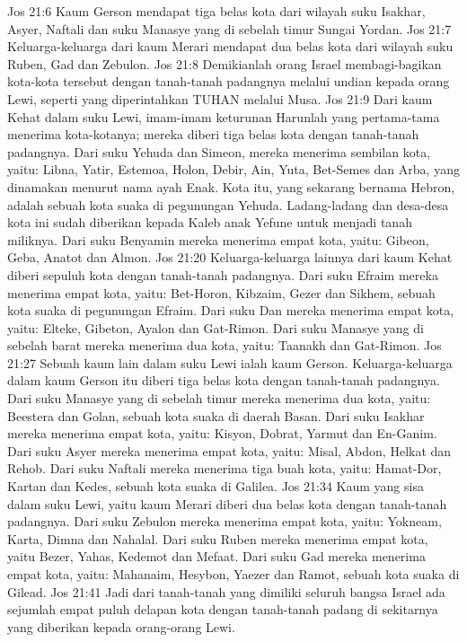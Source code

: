 Jos 21:6  Kaum Gerson mendapat tiga belas kota dari wilayah suku Isakhar, Asyer, Naftali dan suku Manasye yang di sebelah timur Sungai Yordan.
Jos 21:7  Keluarga-keluarga dari kaum Merari mendapat dua belas kota dari wilayah suku Ruben, Gad dan Zebulon.
Jos 21:8  Demikianlah orang Israel membagi-bagikan kota-kota tersebut dengan tanah-tanah padangnya melalui undian kepada orang Lewi, seperti yang diperintahkan TUHAN melalui Musa.
Jos 21:9  Dari kaum Kehat dalam suku Lewi, imam-imam keturunan Harunlah yang pertama-tama menerima kota-kotanya; mereka diberi tiga belas kota dengan tanah-tanah padangnya. Dari suku Yehuda dan Simeon, mereka menerima sembilan kota, yaitu: Libna, Yatir, Estemoa, Holon, Debir, Ain, Yuta, Bet-Semes dan Arba, yang dinamakan menurut nama ayah Enak. Kota itu, yang sekarang bernama Hebron, adalah sebuah kota suaka di pegunungan Yehuda. Ladang-ladang dan desa-desa kota ini sudah diberikan kepada Kaleb anak Yefune untuk menjadi tanah miliknya. Dari suku Benyamin mereka menerima empat kota, yaitu: Gibeon, Geba, Anatot dan Almon.
Jos 21:20  Keluarga-keluarga lainnya dari kaum Kehat diberi sepuluh kota dengan tanah-tanah padangnya. Dari suku Efraim mereka menerima empat kota, yaitu: Bet-Horon, Kibzaim, Gezer dan Sikhem, sebuah kota suaka di pegunungan Efraim. Dari suku Dan mereka menerima empat kota, yaitu: Elteke, Gibeton, Ayalon dan Gat-Rimon. Dari suku Manasye yang di sebelah barat mereka menerima dua kota, yaitu: Taanakh dan Gat-Rimon.
Jos 21:27  Sebuah kaum lain dalam suku Lewi ialah kaum Gerson. Keluarga-keluarga dalam kaum Gerson itu diberi tiga belas kota dengan tanah-tanah padangnya. Dari suku Manasye yang di sebelah timur mereka menerima dua kota, yaitu: Beestera dan Golan, sebuah kota suaka di daerah Basan. Dari suku Isakhar mereka menerima empat kota, yaitu: Kisyon, Dobrat, Yarmut dan En-Ganim. Dari suku Asyer mereka menerima empat kota, yaitu: Misal, Abdon, Helkat dan Rehob. Dari suku Naftali mereka menerima tiga buah kota, yaitu: Hamat-Dor, Kartan dan Kedes, sebuah kota suaka di Galilea.
Jos 21:34  Kaum yang sisa dalam suku Lewi, yaitu kaum Merari diberi dua belas kota dengan tanah-tanah padangnya. Dari suku Zebulon mereka menerima empat kota, yaitu: Yokneam, Karta, Dimna dan Nahalal. Dari suku Ruben mereka menerima empat kota, yaitu Bezer, Yahas, Kedemot dan Mefaat. Dari suku Gad mereka menerima empat kota, yaitu: Mahanaim, Hesybon, Yaezer dan Ramot, sebuah kota suaka di Gilead.
Jos 21:41  Jadi dari tanah-tanah yang dimiliki seluruh bangsa Israel ada sejumlah empat puluh delapan kota dengan tanah-tanah padang di sekitarnya yang diberikan kepada orang-orang Lewi.
